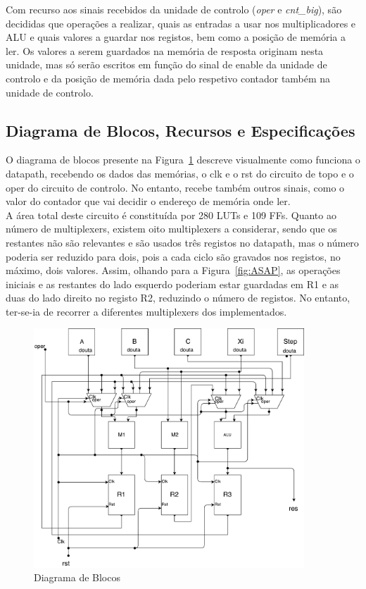 \documentclass{article} %
\begin{document}
			\noindent Com recurso aos sinais recebidos da unidade de controlo (\emph{oper} e \emph{cnt\_big}), são decididas que operações a realizar, quais as entradas a usar nos multiplicadores e ALU e quais valores a guardar nos registos, bem como a posição de memória a ler. Os valores a serem guardados na memória de resposta originam nesta unidade, mas só serão escritos em função do sinal de enable da unidade de controlo e da posição de memória dada pelo respetivo contador também na unidade de controlo.
			

		\subsection{Diagrama de Blocos, Recursos e Especificações}
		O diagrama de blocos presente na Figura~\ref{fig:Diagrama} descreve visualmente como funciona o datapath, recebendo os dados das memórias, o clk e o rst do circuito de topo e o oper do circuito de controlo. No entanto, recebe também outros sinais, como o valor do contador que vai decidir o endereço de memória onde ler.\\

		\noindent A área total deste circuito é constituída por 280 LUTs e 109 FFs. Quanto ao número de multiplexers, existem oito multiplexers a considerar, sendo que os restantes não são relevantes e são usados três registos no datapath, mas o número poderia ser reduzido para dois, pois a cada ciclo são gravados nos registos, no máximo, dois valores. Assim, olhando para a Figura~\ref{fig:ASAP}, as operações iniciais e as restantes do lado esquerdo poderiam estar guardadas em R1 e as duas do lado direito no registo R2, reduzindo o número de registos. No entanto, ter-se-ia de recorrer a diferentes multiplexers dos implementados.\\

		\begin{figure}[htbp]
			\begin{center}
				\includegraphics[width=4in]{Block.pdf}
				\caption{Diagrama de Blocos}
				\label{fig:Diagrama}
			\end{center}
		\end{figure}
\end{document}
